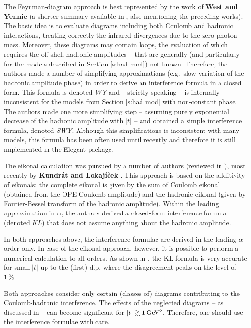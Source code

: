 \documentclass[preprint,12pt]{elsarticle}
\def\un#1{{\,\rm #1}}
\begin{document}
The Feynman-diagram approach is best represented by the work of {\bf West and Yennie} \cite{wy68} (a shorter summary available in \cite[section 1.3.4]{jan_thesis}, also mentioning the preceding works). The basic idea is to evaluate diagrams including both Coulomb and hadronic interactions, treating correctly the infrared divergences due to the zero photon mass. Moreover, these diagrams may contain loops, the evaluation of which requires the off-shell hadronic amplitudes -- that are generally (and particularly for the models described in Section \ref{s:had mod}) not known. Therefore, the authors made a number of simplifying approximations (e.g.~slow variation of the hadronic amplitude phase) in order to derive an interference formula in a closed form. This formula is denoted {\em WY} and -- strictly speaking -- is internally inconsistent for the models from Section \ref{s:had mod} with non-constant phase. The authors made one more simplifying step -- assuming purely exponential decrease of the hadronic amplitude with $|t|$ -- and obtained a simple interference formula, denoted {\em SWY}. Although this simplifications is inconsistent with many models, this formula has been often used until recently and therefore it is still implemented in the Elegent package.

The eikonal calculation was pursued by a number of authors (reviewed in \cite[section 1.3.5]{jan_thesis}), most recently by {\bf Kundr\' at and Lokaj\' i\v cek} \cite{kl94}. This approach is based on the additivity of eikonals: the complete eikonal is given by the sum of Coulomb eikonal (obtained from the OPE Coulomb amplitude) and the hadronic eikonal (given by Fourier-Bessel transform of the hadronic amplitude). Within the leading approximation in $\alpha$, the authors derived a closed-form interference formula (denoted {\em KL}) that does not assume anything about the hadronic amplitude.

In both approaches above, the interference formulae are derived in the leading $\alpha$ order only. In case of the eikonal approach, however, it is possible to perform a numerical calculation to all orders. As shown in \cite[section 1.3.7]{jan_thesis}, the KL formula is very accurate for small $|t|$ up to the (first) dip, where the disagreement peaks on the level of $1\un{\%}$.

Both approaches consider only certain (classes of) diagrams contributing to the Coulomb-hadronic interference. The effects of the neglected diagrams -- as discussed in \cite[section 1.3.6]{jan_thesis} -- can become significant for $|t|\gtrsim 1\un{GeV^2}$. Therefore, one should use the interference formulae with care.
\end{document}
